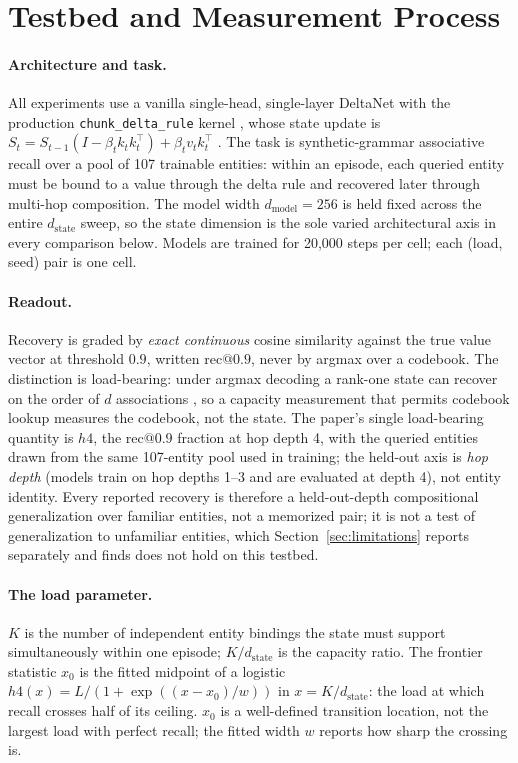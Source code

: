 \section{Testbed and Measurement Process}
\label{sec:testbed}

\paragraph{Architecture and task.} All experiments use a vanilla
single-head, single-layer DeltaNet with the production
\texttt{chunk\_delta\_rule} kernel \citep{yang2024deltanet}, whose state
update is
$S_t = S_{t-1}\left(I - \beta_t k_t k_t^{\top}\right) + \beta_t v_t
k_t^{\top}$ \citep{schlag2021linear}. The task is synthetic-grammar
associative recall over a pool of 107 trainable entities: within an
episode, each queried entity must be bound to a value through the delta
rule and recovered later through multi-hop composition. The model width
$d_{\mathrm{model}} = 256$ is held fixed across the entire
$d_{\mathrm{state}}$ sweep, so the state dimension is the sole varied
architectural axis in every comparison below. Models are trained for
20{,}000 steps per cell; each (load, seed) pair is one cell.

\paragraph{Readout.} Recovery is graded by \emph{exact continuous} cosine
similarity against the true value vector at threshold $0.9$, written
$\mathrm{rec}@0.9$, never by argmax over a codebook. The distinction is
load-bearing: under argmax decoding a rank-one state can recover on the
order of $d$ associations \citep{nichani2025factual}, so a capacity
measurement that permits codebook lookup measures the codebook, not the
state. The paper's single load-bearing quantity is $h4$, the
$\mathrm{rec}@0.9$ fraction at hop depth 4, with the queried entities
drawn from the same 107-entity pool used in training; the held-out axis
is \emph{hop depth} (models train on hop depths 1--3 and are evaluated
at depth 4), not entity identity. Every reported recovery is therefore a
held-out-depth compositional generalization over familiar entities, not
a memorized pair; it is not a test of generalization to unfamiliar
entities, which Section~\ref{sec:limitations} reports separately and
finds does not hold on this testbed.

\paragraph{The load parameter.} $K$ is the number of independent entity
bindings the state must support simultaneously within one episode;
$K/d_{\mathrm{state}}$ is the capacity ratio. The frontier statistic
$x_0$ is the fitted midpoint of a logistic
$h4(x) = L / (1 + \exp((x - x_0)/w))$ in $x = K/d_{\mathrm{state}}$: the
load at which recall crosses half of its ceiling. $x_0$ is a well-defined
transition location, not the largest load with perfect recall; the fitted
width $w$ reports how sharp the crossing is.

